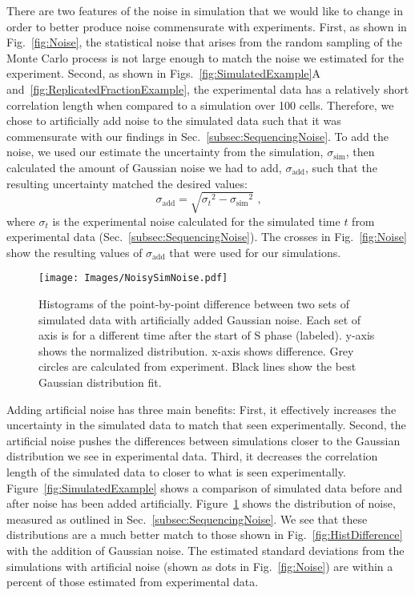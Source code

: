 		There are two features of the noise in simulation that we would like to change in order to better produce noise commensurate with experiments.
		First, as shown in Fig.~\ref{fig:Noise}, the statistical noise that arises from the random sampling of the Monte Carlo process is not large enough to match the noise we estimated for the experiment.
		Second, as shown in Figs.~\ref{fig:SimulatedExample}A and~\ref{fig:ReplicatedFractionExample}, the experimental data has a relatively short correlation length when compared to a simulation over 100 cells.
		Therefore, we chose to artificially add noise to the simulated data such that it was commensurate with our findings in Sec.~\ref{subsec:SequencingNoise}.
		To add the noise, we used our estimate the uncertainty from the simulation, $\sigma_\text{sim}$, then calculated the amount of Gaussian noise we had to add, $\sigma_\text{add}$, such that the resulting uncertainty matched the desired values:
		\begin{equation} \label{eq:AddingNoise}
			\sigma_\text{add} = \sqrt{{\sigma_t}^2 - {\sigma_\text{sim}}^2} \text{ ,}
		\end{equation}
		where $\sigma_t$ is the experimental noise calculated for the simulated time $t$ from experimental data (Sec.~\ref{subsec:SequencingNoise}).
		The crosses in Fig.~\ref{fig:Noise} show the resulting values of $\sigma_\text{add}$ that were used for our simulations.
		
		\begin{figure}[tbh]
			\begin{center}
				\texttt{[image: Images/NoisySimNoise.pdf]}
			\end{center}
				\caption[Estimating Simulation Noise]{\label{fig:NoisySimNoise} Histograms of the point-by-point difference between two sets of simulated data with artificially added Gaussian noise.
					Each set of axis is for a different time after the start of S phase (labeled).
					y-axis shows the normalized distribution.
					x-axis shows difference.
					Grey circles are calculated from experiment.
					Black lines show the best Gaussian distribution fit.
				}
		\end{figure}
		
		Adding artificial noise has three main benefits:
		First, it effectively increases the uncertainty in the simulated data to match that seen experimentally.
		Second, the artificial noise pushes the differences between simulations closer to the Gaussian distribution we see in experimental data.
		Third, it decreases the correlation length of the simulated data to closer to what is seen experimentally.
		Figure~\ref{fig:SimulatedExample} shows a comparison of simulated data before and after noise has been added artificially.
		Figure~\ref{fig:NoisySimNoise} shows the distribution of noise, measured as outlined in Sec.~\ref{subsec:SequencingNoise}.
		We see that these distributions are a much better match to those shown in Fig.~\ref{fig:HistDifference} with the addition of Gaussian noise.
		The estimated standard deviations from the simulations with artificial noise (shown as dots in Fig.~\ref{fig:Noise}) are within a percent of those estimated from experimental data.

